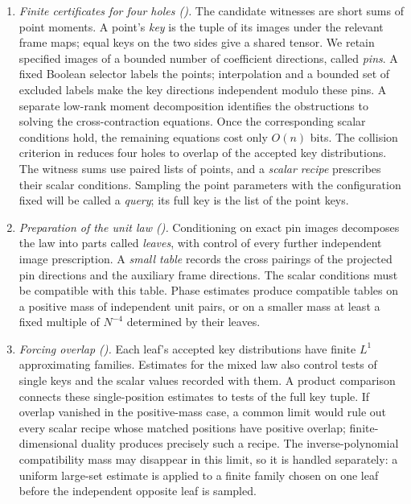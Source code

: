 \begin{enumerate}
\item
\emph{Finite certificates for four holes
().}
The candidate witnesses are short sums of point moments. A point's
\emph{key} is the tuple of its images under the relevant frame maps;
equal keys on the two sides give a shared tensor. We retain specified
images of a bounded number of coefficient directions, called
\emph{pins}. A fixed Boolean selector labels the points;
interpolation and a bounded set of excluded labels make the key
directions independent modulo these pins. A separate low-rank
moment decomposition identifies the obstructions to solving the
cross-contraction equations. Once the corresponding scalar conditions
hold, the remaining equations cost only \(O(n)\) bits. The collision
criterion in  reduces four holes to overlap of
the accepted key distributions. The witness sums use paired lists of
points, and a \emph{scalar recipe} prescribes their scalar conditions.
Sampling the point parameters with the configuration fixed will be
called a \emph{query}; its full key is the list of the point keys.

\item
\emph{Preparation of the unit law
().}
Conditioning on exact pin images decomposes the law into parts called
\emph{leaves}, with control of every further independent image
prescription. A \emph{small table} records the cross pairings of the
projected pin directions and the auxiliary frame directions. The
scalar conditions must be compatible with this table. Phase estimates
produce compatible tables on a positive mass of independent unit
pairs, or on a smaller mass at least a fixed multiple of \(N^{-4}\)
determined by their leaves.

\item
\emph{Forcing overlap
().}
Each leaf's accepted key distributions have finite \(L^1\)
approximating families. Estimates for the mixed law also control
tests of single keys and the scalar values recorded with them.
A product comparison connects these single-position estimates to
tests of the full key tuple. If overlap vanished in the positive-mass
case, a common limit would rule out every scalar recipe whose matched
positions have positive overlap; finite-dimensional duality produces
precisely such a recipe. The inverse-polynomial compatibility mass
may disappear in this limit, so it is handled separately: a uniform large-set
estimate is applied to a finite family chosen on one leaf before
the independent opposite leaf is sampled.
\end{enumerate}

